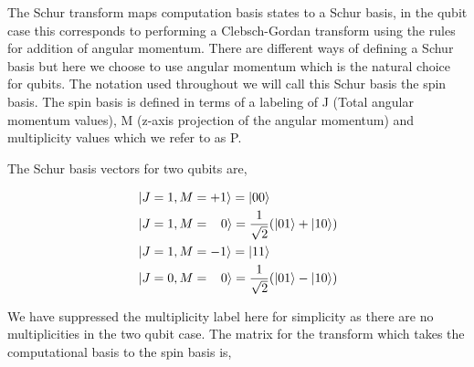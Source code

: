 \documentclass[12pt]{article}
\begin{document}
The Schur transform maps computation basis states to a Schur basis, in the qubit case this corresponds to performing a Clebsch-Gordan transform using the rules for addition of angular momentum. There are different ways of defining a Schur basis but here we choose to use angular momentum which is the natural choice for qubits. The notation used throughout we will call this Schur basis the spin basis. The spin basis is defined in terms of a labeling of J (Total angular momentum values), M (z-axis projection of the angular momentum) and multiplicity values which we refer to as P.

The Schur basis vectors for two qubits are,

\begin{subequations}
\begin{align}
\begin{split}
&\left\vert{J=1, M=+1}\right\rangle = \left\vert{00}\right\rangle \\
&\left\vert{J=1, M=\;\;\;0}\right\rangle = \frac{1}{\sqrt{2}}(\left\vert{01}\right\rangle + \left\vert{10}\right\rangle) \\
&\left\vert{J=1, M=-1}\right\rangle = \left\vert{11}\right\rangle \\
\end{split}\\
\begin{split}
&\left\vert{J=0, M=\;\;\;0}\right\rangle = \frac{1}{\sqrt{2}}(\left\vert{01}\right\rangle - \left\vert{10}\right\rangle)\\
\end{split}
\end{align}
\end{subequations}

We have suppressed the multiplicity label here for simplicity as there are no multiplicities in the two qubit case. The matrix for the transform which takes the computational basis to the spin basis is,
\end{document}
